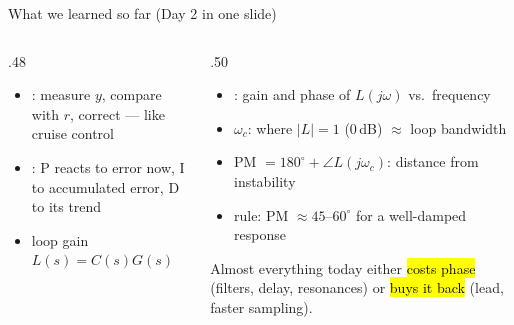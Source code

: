 \documentclass[aspectratio=169,10pt]{beamer}
\newcommand{\sumsym}{\scalebox{.7}{$\Sigma$}}
\begin{document}
\begin{frame}{What we learned so far (Day 2 in one slide)}
\begin{columns}[T]
\begin{column}{.48\textwidth}
\centering
{}

\vspace{1mm}
\small
\begin{itemize}\setlength\itemsep{.4mm}
\item {}: measure $y$, compare with $r$, correct --- like cruise control
\item {}: P reacts to error now, I to accumulated error, D to its trend
\item loop gain $L(s)=C(s)G(s)$
\end{itemize}
\end{column}
\begin{column}{.50\textwidth}
\small
\begin{itemize}\setlength\itemsep{.4mm}
\item {}: gain and phase of $L(j\omega)$ vs.\ frequency
\item {} $\omega_c$: where $|L|=1$ (0\,dB) $\approx$ loop bandwidth
\item {} PM $=180^\circ+\angle L(j\omega_c)$: distance from instability
\item rule: PM $\approx 45$--$60^\circ$ for a well-damped response
\end{itemize}
\begin{keybox}
Almost everything today either \hl{costs phase} (filters, delay, resonances) or \hl{buys it back} (lead, faster sampling).
\end{keybox}
\end{column}
\end{columns}
\end{frame}
\end{document}
